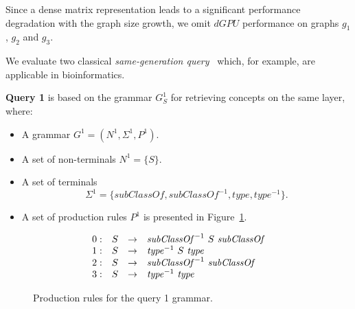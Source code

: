 \documentclass[runningheads,a4paper]{llncs}
\begin{document}
Since a dense matrix representation leads to a significant performance degradation with the graph size growth, we omit $dGPU$ performance on graphs $g_1$, $g_2$ and $g_3$.

We evaluate two classical \textit{same-generation query}~\cite{FndDB} which, for example, are applicable in bioinformatics.

\textbf{Query 1} is based on the grammar $G^1_S$ for retrieving concepts on the same layer, where:
\begin{itemize}
	\item A grammar $G^1 = (N^1, \Sigma^1, P^1)$.
	\item A set of non-terminals $N^1 = \{S\}$.
	\item A set of terminals $$\Sigma^1 = \{subClassOf, subClassOf^{-1}, type, type^{-1}\}.$$
	\item A set of production rules $P^1$ is presented in Figure~\ref{ProductionRulesQuery1}.
\end{itemize}

\begin{figure}[h]
	\[
	\begin{array}{rccl}
	0: & S & \rightarrow & \text{\textit{subClassOf}}^{-1} \ S \ \text{\textit{subClassOf}} \\ 
	1: & S & \rightarrow & \text{\textit{type}}^{-1} \ S \ \text{\textit{type}} \\ 
	2: & S & \rightarrow & \text{\textit{subClassOf}}^{-1} \ \text{\textit{subClassOf}} \\ 
	3: & S & \rightarrow & \text{\textit{type}}^{-1} \ \text{\textit{type}} \\ 
	\end{array}
	\]
	\caption{Production rules for the query 1 grammar.}
	\label{ProductionRulesQuery1}
\end{figure}
\end{document}

